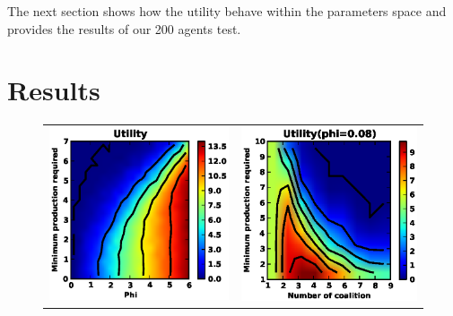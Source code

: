 \documentclass[conference]{IEEEtran}
\begin{document}
The next section shows how the utility behave within the parameters space and provides the results of our 200 agents test.

\section{Results}
\label{sec:results}

\begin{center}
\begin{figure}
\setlength{\tabcolsep}{-0.7em}
\begin{tabular}{cc}
   \includegraphics[scale=0.5]{./figure1/util.eps} &
   \includegraphics[scale=0.5]{./figure6/util2.eps} \\

\end{tabular}
\end{figure}
\end{center}
\end{document}

